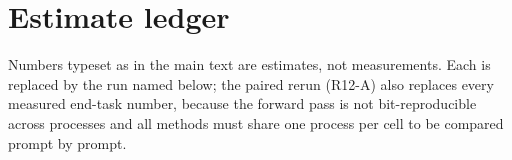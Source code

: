 \begin{table}[h]
\centering
\small
\caption{\sieve{} (router) against each baseline over the 36 valid cells.  A win or loss is a cell-mean difference above 0.05; the interval resamples prompts within each model and context.}
\label{tab:app-h2h}

\end{table}

\begin{table}[h]
\centering
\scriptsize
\setlength{\tabcolsep}{3pt}
\caption{Failure case: Llama-3.1-8B at 128k.  Error types are over single- and multi-key answers at $B\in\{2,3\}$ (80 per method).  \emph{Truncated}: the prediction is a proper prefix of at least three digits of the correct number.  \emph{Wrong needle}: another needle's value.}
\label{tab:app-fail}

\end{table}

\begin{table}[h]
\centering
\scriptsize
\setlength{\tabcolsep}{2.4pt}
\caption{Full end-task grid: mean score over 20 prompts per cell.  Bold marks the best method in each valid row.  $\ddagger$: uncompressed score below 0.9, excluded from every aggregate.  KIVI, KVQuant and H2O are added by the paired rerun (\S\ref{app:ledger}).}
\label{tab:app-grid}

\end{table}

\section{Estimate ledger}
\label{app:ledger}

Numbers typeset as  in the main text are estimates, not measurements.
Each is replaced by the run named below; the paired rerun (R12-A) also
replaces every measured end-task number, because the forward pass is not
bit-reproducible across processes and all methods must share one process per
cell to be compared prompt by prompt.

